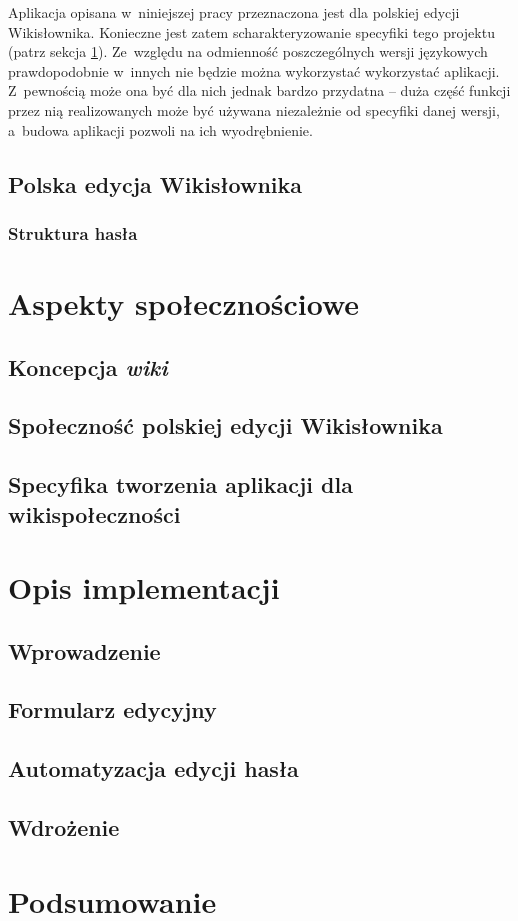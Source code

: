 \documentclass{pracamgr}
\begin{document}
Aplikacja opisana w~niniejszej pracy przeznaczona jest dla polskiej edycji Wikisłownika. Konieczne jest zatem scharakteryzowanie specyfiki tego projektu (patrz sekcja \ref{sec:plwikt}). Ze~względu na odmienność poszczególnych wersji językowych prawdopodobnie w~innych nie będzie można wykorzystać wykorzystać aplikacji. Z~pewnością może ona być dla nich jednak bardzo przydatna -- duża część funkcji przez nią realizowanych może być używana niezależnie od specyfiki danej wersji, a~budowa aplikacji pozwoli na ich wyodrębnienie.



\section{Polska edycja Wikisłownika}
\label{sec:plwikt}



\subsection{Struktura hasła}

\chapter{Aspekty społecznościowe}
\section{Koncepcja \emph{wiki}}
\section{Społeczność polskiej edycji Wikisłownika}
\section{Specyfika tworzenia aplikacji dla wikispołeczności}

\chapter{Opis implementacji}
\section{Wprowadzenie}
\section{Formularz edycyjny}
\section{Automatyzacja edycji hasła}
\section{Wdrożenie}

\chapter{Podsumowanie}


\appendix


\end{document}
